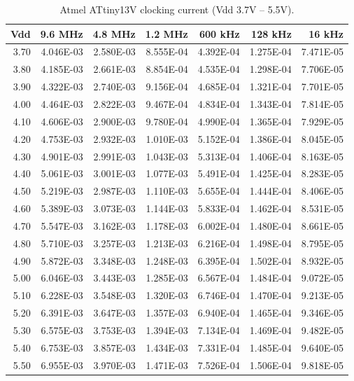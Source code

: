 \begin{table}
\begin{centering}
\begin{tabular}{|r|r|r|r|r|r|r|}
\hline
Vdd  & 9.6 MHz  & 4.8 MHz  & 1.2 MHz  & 600 kHz  & 128 kHz  & 16 kHz\tabularnewline
\hline
3.70  & 4.046E-03  & 2.580E-03  & 8.555E-04  & 4.392E-04  & 1.275E-04  & 7.471E-05 \tabularnewline
3.80  & 4.185E-03  & 2.661E-03  & 8.854E-04  & 4.535E-04  & 1.298E-04  & 7.706E-05 \tabularnewline
3.90  & 4.322E-03  & 2.740E-03  & 9.156E-04  & 4.685E-04  & 1.321E-04  & 7.701E-05 \tabularnewline
4.00  & 4.464E-03  & 2.822E-03  & 9.467E-04  & 4.834E-04  & 1.343E-04  & 7.814E-05 \tabularnewline
4.10  & 4.606E-03  & 2.900E-03  & 9.780E-04  & 4.990E-04  & 1.365E-04  & 7.929E-05 \tabularnewline
4.20  & 4.753E-03  & 2.932E-03  & 1.010E-03  & 5.152E-04  & 1.386E-04  & 8.045E-05 \tabularnewline
4.30  & 4.901E-03  & 2.991E-03  & 1.043E-03  & 5.313E-04  & 1.406E-04  & 8.163E-05 \tabularnewline
4.40  & 5.061E-03  & 3.001E-03  & 1.077E-03  & 5.491E-04  & 1.425E-04  & 8.283E-05 \tabularnewline
4.50  & 5.219E-03  & 2.987E-03  & 1.110E-03  & 5.655E-04  & 1.444E-04  & 8.406E-05 \tabularnewline
4.60  & 5.389E-03  & 3.073E-03  & 1.144E-03  & 5.833E-04  & 1.462E-04  & 8.531E-05 \tabularnewline
4.70  & 5.547E-03  & 3.162E-03  & 1.178E-03  & 6.002E-04  & 1.480E-04  & 8.661E-05 \tabularnewline
4.80  & 5.710E-03  & 3.257E-03  & 1.213E-03  & 6.216E-04  & 1.498E-04  & 8.795E-05 \tabularnewline
4.90  & 5.872E-03  & 3.348E-03  & 1.248E-03  & 6.395E-04  & 1.502E-04  & 8.932E-05 \tabularnewline
5.00  & 6.046E-03  & 3.443E-03  & 1.285E-03  & 6.567E-04  & 1.484E-04  & 9.072E-05 \tabularnewline
5.10  & 6.228E-03  & 3.548E-03  & 1.320E-03  & 6.746E-04  & 1.470E-04  & 9.213E-05 \tabularnewline
5.20  & 6.391E-03  & 3.647E-03  & 1.357E-03  & 6.940E-04  & 1.465E-04  & 9.346E-05 \tabularnewline
5.30  & 6.575E-03  & 3.753E-03  & 1.394E-03  & 7.134E-04  & 1.469E-04  & 9.482E-05 \tabularnewline
5.40  & 6.753E-03  & 3.857E-03  & 1.434E-03  & 7.331E-04  & 1.485E-04  & 9.640E-05 \tabularnewline
5.50  & 6.955E-03  & 3.970E-03  & 1.471E-03  & 7.526E-04  & 1.506E-04  & 9.818E-05 \tabularnewline
\hline
\end{tabular}
\par\end{centering}

\protect\caption{Atmel ATtiny13V clocking current (Vdd 3.7V -- 5.5V).}


\end{table}
